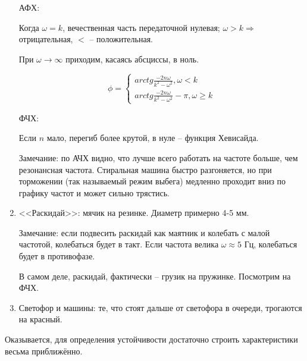\documentclass[main.tex]{subfiles}
\begin{document}
\begin{enumerate}[noitemsep]
АФХ:


Когда $ \omega = k $, вечественная часть передаточной нулевая; $ \omega > k \Rightarrow $ отрицательная, $ < $ -- положительная.

При $ \omega \to \infty $ приходим, касаясь абсциссы, в ноль.

$$ \phi = \begin{cases}
arctg \frac{- 2n \omega}{k^2 - \omega^2}, \omega < k \\
arctg \frac{- 2n \omega}{k^2 - \omega^2} - \pi, \omega \ge k
\end{cases} $$

ФЧХ:


Если $n$ мало, перегиб более крутой, в нуле -- функция Хевисайда.

Замечание: по АЧХ видно, что лучше всего работать на частоте больше, чем резонансная частота.
Стиральная машина быстро разгоняется, но при торможении (так называемый режим выбега) медленно проходит вниз по графику частот и может сильно трястись.

\item <<Раскидай>>: мячик на резинке. Диаметр примерно 4-5 мм.

Замечание: если подвесить раскидай как маятник и колебать с малой частотой, колебаться будет в такт.
Если частота велика $ \omega \approx 5 $ Гц, колебаться будет в противофазе.

В самом деле, раскидай, фактически -- грузик на пружинке.
Посмотрим на ФЧХ.

\item Светофор и машины: те, что стоят дальше от светофора в очереди, трогаются на красный.
	
\end{enumerate}

Оказывается, для определения устойчивости достаточно строить характеристики весьма приближённо.
\end{document}
